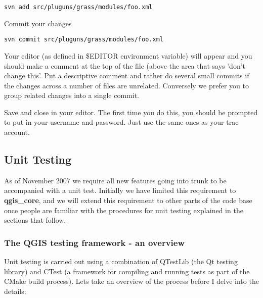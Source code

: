 \begin{verbatim}
svn add src/pluguns/grass/modules/foo.xml
\end{verbatim}

Commit your changes

\begin{verbatim}
svn commit src/pluguns/grass/modules/foo.xml
\end{verbatim}

Your editor (as defined in \$EDITOR environment variable) will appear and you
should make a comment at the top of the file (above the area that says 'don't
change this'. Put a descriptive comment and rather do several small commits if
the changes across a number of files are unrelated. Conversely we prefer you to
group related changes into a single commit.

Save and close in your editor. The first time you do this, you should be
prompted to put in your username and password. Just use the same ones as your
trac account.


\subsection{Unit Testing}
As of November 2007 we require all new features going into trunk to be
accompanied with a unit test. Initially we have limited this requirement to
\textbf{qgis\_core}, and we will extend this requirement to other parts of the code base
once people are familiar with the procedures for unit testing explained in the
sections that follow.

\subsubsection{The QGIS testing framework  - an overview}
Unit testing is carried out using a combination of QTestLib (the Qt testing
library) and CTest (a framework for compiling and running tests as part of the
CMake build process).  Lets take an overview of the process before I delve into
the details:

